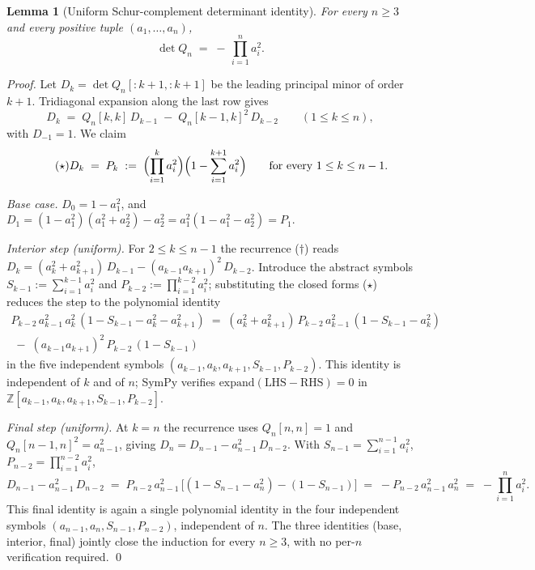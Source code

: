 \documentclass[11pt,a4paper]{article}
\newtheorem{lemma}[theorem]{Lemma}
\theoremstyle{remark}
\theoremstyle{plain}
\begin{document}
\begin{lemma}[Uniform Schur-complement determinant identity]
\label{lem:uniform-detQ}
For every $n \ge 3$ and every positive tuple $(a_1, \ldots, a_n)$,
\[
\det Q_n  \;=\;  -\, \prod_{i=1}^{n} a_i^2.
\]
\end{lemma}

\begin{proof}
Let $D_k = \det Q_n[:k{+}1,:k{+}1]$ be the leading principal minor
of order $k+1$.  Tridiagonal expansion along the last row gives
\begin{equation}\tag{$\dagger$}
D_k \;=\; Q_n[k,k]\, D_{k-1} \;-\; Q_n[k-1,k]^2\, D_{k-2}
\qquad (1 \le k \le n),
\end{equation}
with $D_{-1} = 1$.  We claim
\begin{equation}\tag{$\star$}
D_k \;=\; P_k \;:=\;
\Bigl(\prod_{i=1}^k a_i^2\Bigr)\Bigl(1 - \sum_{i=1}^{k+1} a_i^2\Bigr)
\qquad \text{for every } 1 \le k \le n-1.
\end{equation}

\emph{Base case.}  $D_0 = 1 - a_1^2$, and
$D_1 = (1 - a_1^2)(a_1^2 + a_2^2) - a_2^2
     = a_1^2(1 - a_1^2 - a_2^2) = P_1$.

\emph{Interior step (uniform).}  For $2 \le k \le n-1$ the
recurrence ($\dagger$) reads
$D_k = (a_k^2 + a_{k+1}^2)\, D_{k-1} - (a_{k-1} a_{k+1})^2\, D_{k-2}$.
Introduce the abstract symbols
$S_{k-1} := \sum_{i=1}^{k-1} a_i^2$ and
$P_{k-2} := \prod_{i=1}^{k-2} a_i^2$; substituting the closed forms
($\star$) reduces the step to the polynomial identity
\begin{multline*}
P_{k-2}\, a_{k-1}^2\, a_k^2\, (1 - S_{k-1} - a_k^2 - a_{k+1}^2)
\;=\;
(a_k^2 + a_{k+1}^2)\, P_{k-2}\, a_{k-1}^2\, (1 - S_{k-1} - a_k^2) \\
\;-\;
(a_{k-1} a_{k+1})^2\, P_{k-2}\, (1 - S_{k-1})
\end{multline*}
in the five independent symbols $(a_{k-1}, a_k, a_{k+1}, S_{k-1},
P_{k-2})$.  This identity is independent of $k$ and of $n$; SymPy
verifies $\mathrm{expand}(\text{LHS} - \text{RHS}) = 0$ in
$\mathbb{Z}[a_{k-1}, a_k, a_{k+1}, S_{k-1}, P_{k-2}]$.

\emph{Final step (uniform).}  At $k = n$ the recurrence uses
$Q_n[n,n] = 1$ and $Q_n[n-1,n]^2 = a_{n-1}^2$, giving
$D_n = D_{n-1} - a_{n-1}^2\, D_{n-2}$.  With
$S_{n-1} = \sum_{i=1}^{n-1} a_i^2$, $P_{n-2} = \prod_{i=1}^{n-2} a_i^2$,
\[
D_{n-1} - a_{n-1}^2\, D_{n-2}
\;=\; P_{n-2}\, a_{n-1}^2\, \bigl[(1 - S_{n-1} - a_n^2) - (1 - S_{n-1})\bigr]
\;=\; -P_{n-2}\, a_{n-1}^2\, a_n^2
\;=\; -\prod_{i=1}^n a_i^2.
\]
This final identity is again a single polynomial identity in the four
independent symbols $(a_{n-1}, a_n, S_{n-1}, P_{n-2})$, independent of
$n$.  The three identities (base, interior, final) jointly close the
induction for every $n \ge 3$, with no per-$n$ verification required.
\qed
\end{proof}
\end{document}
